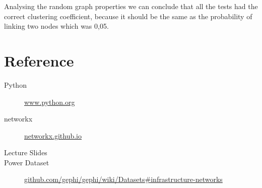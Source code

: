 \documentclass[a4paper,titlepage,11pt]{article}
\begin{document}
Analysing the random graph properties we can conclude that all the tests had the correct clustering coefficient, because it should
be the same as the probability of linking two nodes which was 0,05.


\section{Reference}
\begin{description}
  \item[Python] \href{https://www.python.org}{www.python.org}
  \item[networkx] \href{https://networkx.github.io}{networkx.github.io}
  \item[Lecture Slides]
  \item[Power Dataset] \href{https://github.com/gephi/gephi/wiki/Datasets#infrastructure-networks}{github.com/gephi/gephi/wiki/Datasets\#infrastructure-networks}
\end{description}
\end{document}
